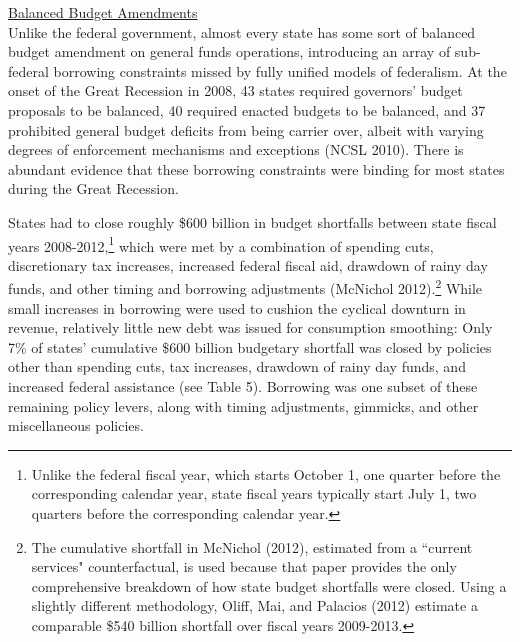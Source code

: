 \documentclass[12pt,letterpaper]{article}
\begin{document}
\noindent \underline{Balanced Budget Amendments} \smallskip \\ 
Unlike the federal government, almost every state has some sort of balanced budget amendment on general funds operations, introducing an array of sub-federal borrowing constraints missed by fully unified models of federalism. At the onset of the Great Recession in 2008, 43 states required governors' budget proposals to be balanced, 40 required enacted budgets to be balanced, and 37 prohibited general budget deficits from being carrier over, albeit with varying degrees of enforcement mechanisms and exceptions (NCSL 2010). There is abundant evidence that these borrowing constraints were binding for most states during the Great Recession. 

States had to close roughly \$600 billion in budget shortfalls between state fiscal years 2008-2012,\footnote{Unlike the federal fiscal year, which starts  October 1, one quarter before the corresponding calendar year, state fiscal years typically start July 1, two quarters before the corresponding calendar year.} which were met by a combination of spending cuts, discretionary tax increases, increased federal fiscal aid, drawdown of rainy day funds, and other timing and borrowing adjustments (McNichol 2012).\footnote{The cumulative shortfall in McNichol (2012), estimated from a ``current services" counterfactual, is used because that paper provides the only comprehensive breakdown of how state budget shortfalls were closed. Using a slightly different methodology, Oliff, Mai, and Palacios (2012) estimate a comparable \$540 billion shortfall over fiscal years 2009-2013.} While small increases in borrowing were used to cushion the cyclical downturn in revenue, relatively little new debt was issued for consumption smoothing: Only 7\% of states' cumulative \$600 billion budgetary shortfall was closed by policies other than spending cuts, tax increases, drawdown of rainy day funds, and increased federal assistance (see Table 5). Borrowing was one subset of these remaining policy levers, along with timing adjustments, gimmicks, and other miscellaneous policies. 
\end{document}
